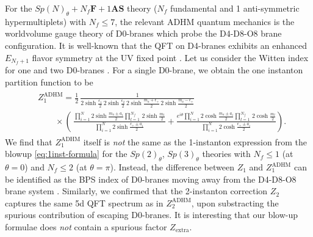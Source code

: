 \documentclass[letterpaper, 11pt]{article}
\def\e{\epsilon}
\begin{document}
{For the $Sp(N)_\theta + N_f \mathbf{F} + 1\mathbf{AS}$ theory ($N_f$ fundamental and 1 anti-symmetric hypermultiplets) with $N_f \leq 7$, the relevant ADHM quantum mechanics is the worldvolume gauge theory of D0-branes which probe the D4-D8-O8 brane configuration. It is well-known that the QFT on D4-branes exhibits an enhanced $E_{N_f + 1}$ flavor symmetry at the UV fixed point \cite{Seiberg:1996bd}. Let us consider the Witten index for one and two D0-branes \cite{Kim:2012gu,Hwang:2014uwa}. For a single D0-brane, we obtain the one instanton partition function to be 
\begin{align}
\begin{split}
&  Z_1^{\text{ADHM}}=\frac{1}{2} \, \frac{1}{2\sinh\frac{\e_1}{2}\,2\sinh\frac{\e_2}{2}\, 2\sinh\frac{m_a+ \e_+}{2} \, 2\sinh\frac{m_a-\e_+}{2}} \\
& \qquad \times\left(\,\frac{\prod_{i=1}^{N}2\sinh\frac{m_a\pm a_i}{2}\prod_{l=1}^{N_f}\,2\sinh\frac{m_l}{2}}{\prod_{i=1}^{N}2\sinh\frac{\e_+\pm a_i}{2}}
  +\frac{e^{i\theta}\prod_{i=1}^{N}2\cosh\frac{m_a\pm a_i}{2}\prod_{l=1}^{N_f}\,2\cosh\frac{m_l}{2}}{ \prod_{i=1}^{N}2\cosh\frac{\e_+\pm a_i}{2}}\right).
\end{split}
\end{align}
We find that $Z_1^{\text{ADHM}}$ itself is \emph{not} the same as the 1-instanton expression from the blowup \eqref{eq:1inst-formula} for the $Sp(2)_\theta$, $Sp(3)_\theta$ theories with $N_f \leq 1$ (at $\theta=0$) and $N_f \leq 2$ (at $\theta=\pi$). Instead, the difference between $Z_1$ and $Z_1^{\text{ADHM}}$ can be identified as the BPS index of D0-branes moving away from the D4-D8-O8 brane system \cite{Kim:2012gu,Hwang:2014uwa}. 
Similarly, we confirmed that the 2-instanton correction $Z_2$ captures the same 5d QFT spectrum as in $Z_2^\text{ADHM}$, upon substracting the spurious contribution of escaping D0-branes. It is interesting that our blow-up formulae does \emph{not} contain a spurious factor $Z_\text{extra}$.


}
\end{document}
